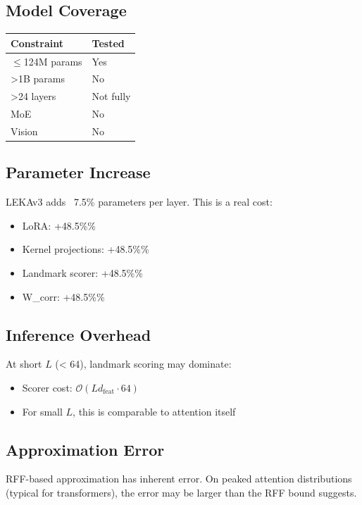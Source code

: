 \subsection{Model Coverage}

\begin{table}[H]
\centering
\small
\begin{tabular}{ll}
\toprule
\textbf{Constraint} & \textbf{Tested} \\
\midrule
$\le$124M params & Yes \\
>1B params & No \\
>24 layers & Not fully \\
MoE & No \\
Vision & No \\
\bottomrule
\end{tabular}
\end{table}

\subsection{Parameter Increase}

LEKAv3 adds ~7.5\% parameters per layer. This is a real cost:
\begin{itemize}
\item LoRA: +48.5\%\%
\item Kernel projections: +48.5\%\%
\item Landmark scorer: +48.5\%\%
\item W\_corr: +48.5\%\%

\end{itemize}
\subsection{Inference Overhead}

At short $L$ (< 64), landmark scoring may dominate:
\begin{itemize}
\item Scorer cost: $\mathcal{O}(L d_\text{feat} \cdot 64)$
\item For small $L$, this is comparable to attention itself

\end{itemize}
\subsection{Approximation Error}

RFF-based approximation has inherent error. On peaked attention 
distributions (typical for transformers), the error may be larger than 
the RFF bound suggests.

